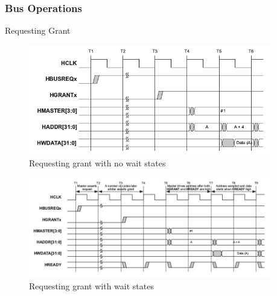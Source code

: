\subsubsection{Bus Operations}

\begin{subsubsection}{Requesting Grant}
\label{op:grant}


  \begin{figure}[H]
    \centering
    \includegraphics[width=0.95\textwidth]{figures/others/grant_nowait.png}
    \caption{Requesting grant with no wait states  }
    \label{fig:gnwsm}
\end{figure}


  \begin{figure}[H]
    \centering
    \includegraphics[width=0.95\textwidth]{figures/others/grant_wait.png}
    \caption{Requesting grant with wait states  }
    \label{fig:gwsm}
\end{figure}
\end{subsubsection}

